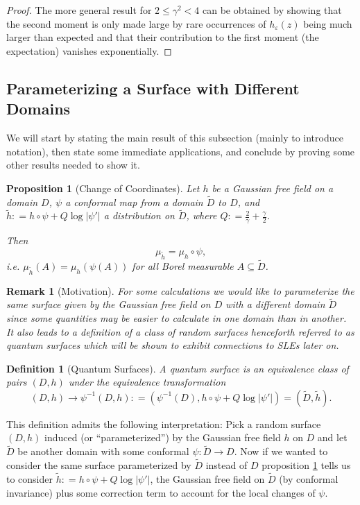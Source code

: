 \documentclass[11pt,reqno]{amsart}
\numberwithin{equation}{section}
\newtheorem{pro}[thm]{Proposition}
\newtheorem{defi}[thm]{Definition}
\newtheorem{rem}[thm]{Remark}
\newcommand{\deq}{\mathrel{\mathop:}=}
\newcommand{\eps}{\varepsilon}
\begin{document}
\begin{proof}
	The more general result for $2\leq\gamma^2<4$ can be obtained by showing that the second moment is only made large by rare occurrences of $h_\eps(z)$ being much larger than expected and that their contribution to the first moment (the expectation) vanishes exponentially.
\end{proof}

\subsection{Parameterizing a Surface with Different Domains}
We will start by stating the main result of this subsection (mainly to introduce notation), then state some immediate applications, and conclude by proving some other results needed to show it.
\begin{pro}[Change of Coordinates]\label{prop:changeofcoordinates}
	Let $h$ be a Gaussian free field on a domain $D$, $\psi$ a conformal map from a domain $\tilde D$ to $D$, and $\tilde h\deq h\circ\psi+Q\log|\psi'|$ a distribution on $\tilde D$, where $Q\deq \frac{2}{\gamma}+\frac{\gamma}{2}$.
	
	Then $$\mu_{\tilde h}=\mu_h\circ\psi,$$
	i.e. $\mu_{\tilde h}(A)=\mu_h(\psi(A))$ for all Borel measurable $A\subseteq \tilde D$.
\end{pro}
\begin{rem}[Motivation]
	For some calculations we would like to parameterize the same surface given by the Gaussian free field on $D$ with a different domain $\tilde D$ since some quantities may be easier to calculate in one domain than in another. It also leads to a definition of a class of random surfaces henceforth referred to as quantum surfaces which will be shown to exhibit connections to SLEs later on.
\end{rem}

\begin{defi}[Quantum Surfaces]\label{def:quantumsurface}
	A quantum surface is an equivalence class of pairs $(D,h)$ under the equivalence transformation $$(D,h)\rightarrow \psi^{-1}(D,h)\deq (\psi^{-1}(D),h\circ\psi+Q\log|\psi'|)=(\tilde D,\tilde h).$$
\end{defi}

This definition admits the following interpretation: Pick a random surface $(D,h)$ induced (or ``parameterized'') by the Gaussian free field $h$ on $D$ and let $\tilde D$ be another domain with some conformal $\psi:\tilde D\rightarrow D$. Now if we wanted to consider the same surface parameterized by $\tilde D$ instead of $D$ proposition \ref{prop:changeofcoordinates} tells us to consider $\tilde h\deq h\circ\psi + Q\log|\psi'|$, the Gaussian free field on $\tilde D$ (by conformal invariance) plus some correction term to account for the local changes of $\psi$.
\end{document}
